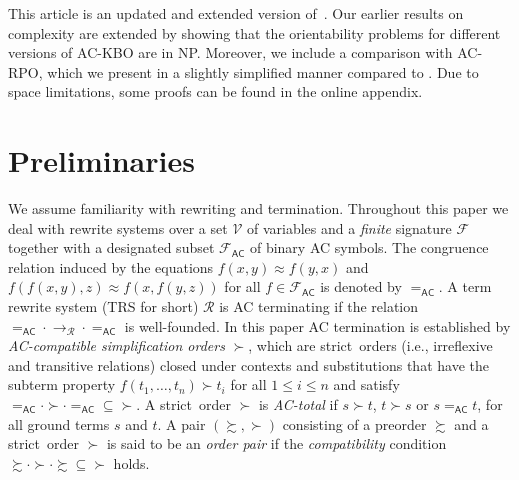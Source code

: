 \documentclass{tlp}
\newcommand{\m}[1]{\mathsf{#1}}
\newcommand{\mc}[1]{\mathcal{#1}}
\newcommand{\mr}[1]{\mathrm{#1}}
\newcommand{\FF}{\mc{F}}
\newcommand{\VV}{\mc{V}}
\newcommand{\AC}{\mr{\m{AC}}}
\newcommand{\seq}[2][n]{{#2_1},\dots,{#2_{#1}}}
\newcommand{\RR}{\mc{R}}
\newcommand{\proper}{proper}
\renewcommand{\proper}{strict}
\newcommand{\GT}{\mathrel{\succ}}
\newcommand{\GS}{\mathrel{\succsim}}
\begin{document}
This article is an updated and extended version of~\cite{YWHM14}.
Our earlier results on complexity are extended by showing that
the orientability problems for different versions of AC-KBO
are in NP. Moreover, we include a comparison with AC-RPO, which
we present in a slightly simplified manner compared to \cite{R02}.
Due to space limitations, some proofs can be found in the online appendix.

\section{Preliminaries}

We assume familiarity with rewriting and termination. Throughout this
paper we deal with rewrite systems over
a set $\VV$ of variables and a \emph{finite} signature $\FF$
together with a designated subset $\FF_\AC$ of binary AC symbols. The
congruence relation induced by the equations $f(x,y) \approx f(y,x)$ and
$f(f(x,y),z) \approx f(x,f(y,z))$ for all $f \in \FF_\AC$ is denoted by
$=_\AC$. A term rewrite system (TRS for short) $\RR$ is AC terminating if
the relation ${=_\AC} \cdot {\to_\RR} \cdot {=_\AC}$ is well-founded. In
this paper AC termination is established by
\emph{AC-compatible simplification orders} $\GT$, which are
\proper\ orders (i.e., irreflexive and transitive relations)
closed under contexts and substitutions that have the subterm property
$f(\seq{t}) \GT t_i$ for all $1 \leqslant i \leqslant n$ and satisfy
${=_\AC} \cdot {\GT} \cdot {=_\AC} \subseteq {\GT}$.
A \proper\ order $\GT$ is \emph{AC-total} if
$s \GT t$, $t \GT s$ or $s =_\AC t$, for all ground terms $s$ and $t$.
A pair $({\GS},{\GT})$ consisting of a preorder $\GS$ and a \proper\
order $\GT$ is said to be an \emph{order pair} if the \emph{compatibility}
condition ${\GS \cdot \GT \cdot \GS} \subseteq {\GT}$ holds.
\end{document}
